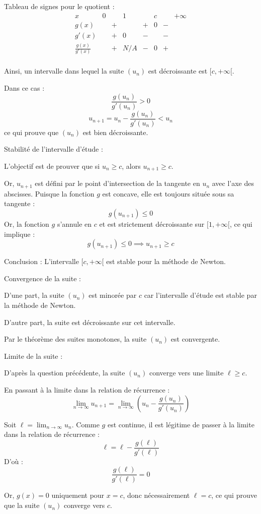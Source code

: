 \documentclass[10pt,a4paper]{article}
\begin{document}
Tableau de signes pour le quotient :
\[
\begin{array}{c|ccccccc}
x & 0 &  & 1 &  & c & & +\infty \\
\hline
g(x) & & + &  & + & 0 & - &  \\
\hline
g'(x) &  & + & 0 & - &  & - &  \\
\hline
\frac{g(x)}{g'(x)} & & + & N/A & - & 0 & + &  \\
\end{array}
\]

Ainsi, un intervalle dans lequel la suite \( (u_n) \) est décroissante est \( [c , +\infty[ \).

Dans ce cas :
\[
\frac{g(u_n)}{g'(u_n)} > 0
\]
\[
u_{n+1} = u_n - \frac{g(u_n)}{g'(u_n)} < u_n
\]
ce qui prouve que \( (u_n) \) est bien décroissante.

\q Stabilité de l'intervalle d'étude :

L'objectif est de prouver que si \( u_n \geq c \), alors \( u_{n+1} \geq c \).

Or, \( u_{n+1} \) est défini par le point d'intersection de la tangente en  \( u_n \) avec l'axe des
abscisses. Puisque la fonction \( g \) est concave, elle est toujours située sous sa tangente :
\[
g(u_{n+1}) \leq 0
\]
Or, la fonction \( g \) s'annule en \( c \) et est strictement décroissante sur \( [1, +\infty[ \),
ce qui implique :
\[
g(u_{n+1}) \leq 0 \implies u_{n+1} \geq c
\]

Conclusion : L'intervalle \( [c, +\infty[ \) est stable pour la méthode de Newton.


\q Convergence de la suite :

D'une part, la suite \( (u_n) \) est minorée par \( c \) car l'intervalle d'étude est stable par la
méthode de Newton.

D'autre part, la suite est décroissante sur cet intervalle.

Par le théorème des suites monotones, la suite \( (u_n) \) est convergente.


\q Limite de la suite :

D'après la question précédente, la suite \( (u_n) \) converge vers une limite \( \ell \geq c \).

En passant à la limite dans la relation de récurrence :
\[
\lim_{n \to \infty} u_{n+1} = \lim_{n \to \infty} \left( u_n - \frac{g(u_n)}{g'(u_n)} \right)
\]

Soit \( \ell = \lim_{n \to \infty} u_n \). Comme \( g \) est continue, il est légitime de passer à
la limite dans la relation de récurrence :
\[
\ell = \ell - \frac{g(\ell)}{g'(\ell)}
\]
D'où :
\[
\frac{g(\ell)}{g'(\ell)} = 0
\]

Or, \( g(x) = 0 \) uniquement pour \( x = c \), donc nécessairement \( \ell = c \), ce qui prouve
que la suite \( (u_n) \) converge vers \( c \).
\end{document}
